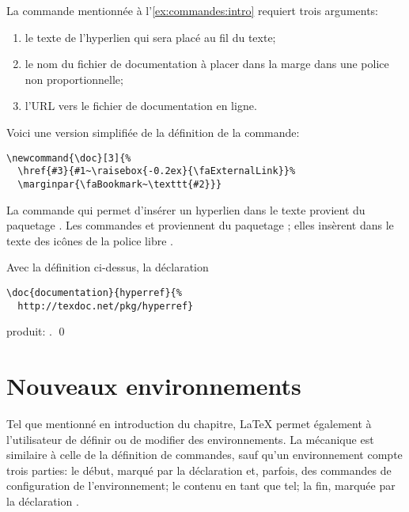 \begin{exemple}
  \label{ex:commandes:doc}
  La commande \cmdprint{\doc} mentionnée à
  l'\autoref{ex:commandes:intro} requiert trois arguments:
  \begin{enumerate}
  \item le texte de l'hyperlien qui sera placé au fil du texte;
  \item le nom du fichier de documentation à placer dans la marge dans
    une police non proportionnelle;
  \item l'URL vers le fichier de documentation en ligne.
  \end{enumerate}
  Voici une version simplifiée de la définition de la commande:
\begin{lstlisting}
\newcommand{\doc}[3]{%
  \href{#3}{#1~\raisebox{-0.2ex}{\faExternalLink}}%
  \marginpar{\faBookmark~\texttt{#2}}}
\end{lstlisting}
  La commande \cmd{\href} qui permet d'insérer un hyperlien dans le
  texte provient du paquetage  \citep{hyperref}. Les
  commandes  et \cmdprint{\faBookmark}
  proviennent du paquetage  \citep{fontawesome}; elles
  insèrent dans le texte des icônes de la police libre %
  . %

  Avec la définition ci-dessus, la déclaration
\begin{lstlisting}
\doc{documentation}{hyperref}{%
  http://texdoc.net/pkg/hyperref}
\end{lstlisting}
  produit: . %
  \qed
\end{exemple}


\section{Nouveaux environnements}
\label{sec:commandes:environnements}

Tel que mentionné en introduction du chapitre, {\LaTeX} permet
également à l'utilisateur de définir ou de modifier des
environnements. La mécanique est similaire à celle de la définition de
commandes, sauf qu'un environnement compte trois parties: le début,
marqué par la déclaration  et, parfois, des
  commandes de configuration de l'environnement; le contenu en tant
  que tel; la fin, marquée par la déclaration
  .

